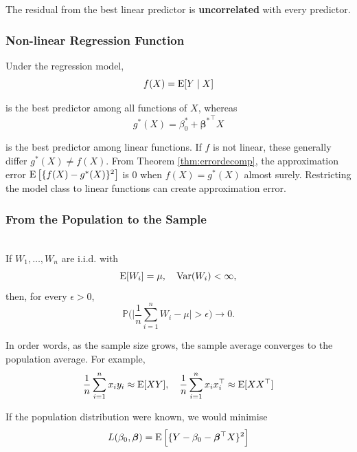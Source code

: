 The residual from the best linear predictor is \textbf{uncorrelated} with every predictor.

\subsubsection{Non-linear Regression Function}
Under the regression model,
\begin{equation*}
    f(X)=\operatorname{E}[Y \mid X]
\end{equation*}

is the best predictor among all functions of $X$, whereas
\begin{equation*}
    g^*(X)=\beta_0^*+{\bm\beta^{\bm*}}^{\top}X
\end{equation*}

is the best predictor among linear functions. If $f$ is not linear, these generally differ $g^*(X) \neq f(X)$. From Theorem \ref{thm:errordecomp}, the approximation error $\operatorname{E} \big[\{f(X)-g^*(X)\}^2\big]$ is 0 when $f(X)=g^*(X)$ almost surely. Restricting the model class to linear functions can create approximation error.

\subsubsection{From the Population to the Sample}
\begin{theorem}\leavevmode\\
    If $W_1,\dots,W_n$ are i.i.d. with
    \begin{equation*}
        \operatorname{E}[W_i]=\mu, \quad \operatorname{Var}(W_i)<\infty,
    \end{equation*}
    then, for every $\epsilon > 0$,
    \begin{equation*}
        \mathbb{P}\bigg(\bigg|\frac{1}{n}\sum_{i=1}^{n}W_i-\mu\bigg|>\epsilon\bigg)\longrightarrow 0.
    \end{equation*}
\end{theorem}

In order words, as the sample size grows, the sample average converges to the population average. For example,
\begin{equation*}
    \frac{1}{n}\sum_{i=1}^{n}x_iy_i\approx\operatorname{E}[XY], \quad
    \frac{1}{n}\sum_{i=1}^{n}x_ix_i^\top\approx\operatorname{E}[XX^\top]
\end{equation*}

If the population distribution were known, we would minimise
\begin{equation*}
    L(\beta_0,\bm\beta)=\operatorname{E}\Big[\{Y-\beta_0-\bm\beta^\top X\}^2\Big]
\end{equation*}

